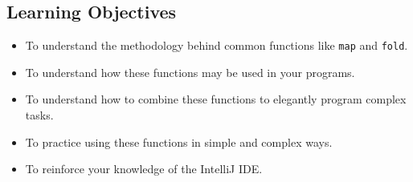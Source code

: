 \documentclass[12pt,a4paper]{exam}
\begin{document}
%

\subsection*{Learning Objectives}

\begin{itemize}
	\item To understand the methodology behind common functions like \verb!map! and \verb!fold!.
	\item To understand how these functions may be used in your programs.
	\item To understand how to combine these functions to elegantly program complex tasks.
	\item To practice using these functions in simple and complex ways.
	\item To reinforce your knowledge of the IntelliJ IDE.
\end{itemize}
\end{document}
